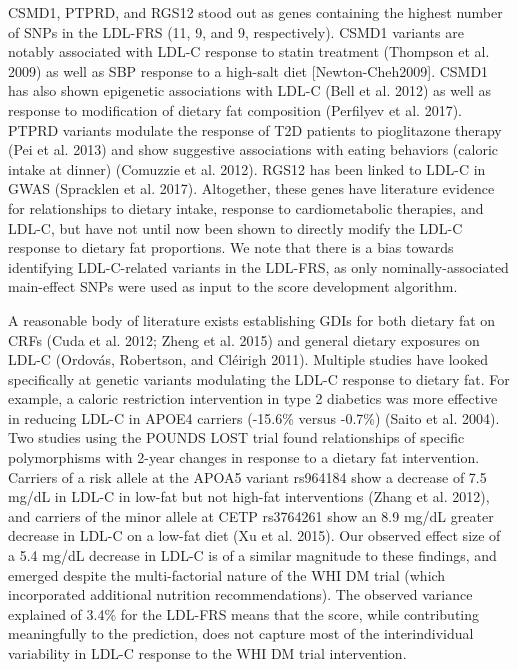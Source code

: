 \documentclass[]{article}
\begin{document}
CSMD1, PTPRD, and RGS12 stood out as genes containing the highest number
of SNPs in the LDL-FRS (11, 9, and 9, respectively). CSMD1 variants are
notably associated with LDL-C response to statin treatment (Thompson et
al. 2009) as well as SBP response to a high-salt diet
{[}Newton-Cheh2009{]}. CSMD1 has also shown epigenetic associations with
LDL-C (Bell et al. 2012) as well as response to modification of dietary
fat composition (Perfilyev et al. 2017). PTPRD variants modulate the
response of T2D patients to pioglitazone therapy (Pei et al. 2013) and
show suggestive associations with eating behaviors (caloric intake at
dinner) (Comuzzie et al. 2012). RGS12 has been linked to LDL-C in GWAS
(Spracklen et al. 2017). Altogether, these genes have literature
evidence for relationships to dietary intake, response to
cardiometabolic therapies, and LDL-C, but have not until now been shown
to directly modify the LDL-C response to dietary fat proportions. We
note that there is a bias towards identifying LDL-C-related variants in
the LDL-FRS, as only nominally-associated main-effect SNPs were used as
input to the score development algorithm.

A reasonable body of literature exists establishing GDIs for both
dietary fat on CRFs (Cuda et al. 2012; Zheng et al. 2015) and general
dietary exposures on LDL-C (Ordovás, Robertson, and Cléirigh 2011).
Multiple studies have looked specifically at genetic variants modulating
the LDL-C response to dietary fat. For example, a caloric restriction
intervention in type 2 diabetics was more effective in reducing LDL-C in
APOE4 carriers (-15.6\% versus -0.7\%) (Saito et al. 2004). Two studies
using the POUNDS LOST trial found relationships of specific
polymorphisms with 2-year changes in response to a dietary fat
intervention. Carriers of a risk allele at the APOA5 variant rs964184
show a decrease of 7.5 mg/dL in LDL-C in low-fat but not high-fat
interventions (Zhang et al. 2012), and carriers of the minor allele at
CETP rs3764261 show an 8.9 mg/dL greater decrease in LDL-C on a low-fat
diet (Xu et al. 2015). Our observed effect size of a 5.4 mg/dL decrease
in LDL-C is of a similar magnitude to these findings, and emerged
despite the multi-factorial nature of the WHI DM trial (which
incorporated additional nutrition recommendations). The observed
variance explained of 3.4\% for the LDL-FRS means that the score, while
contributing meaningfully to the prediction, does not capture most of
the interindividual variability in LDL-C response to the WHI DM trial
intervention.
\end{document}
